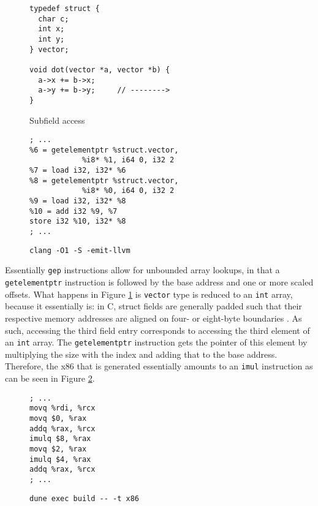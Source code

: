\documentclass{article}
\begin{document}
\begin{figure}[H]
   \begin{minipage}{0.48\textwidth}
     \centering
     \begin{verbatim}
typedef struct {
  char c;
  int x;
  int y;
} vector;

void dot(vector *a, vector *b) {
  a->x += b->x;
  a->y += b->y;     // -------->
}
     \end{verbatim}
     \caption{Subfield access}\label{fig:vector.c}
   \end{minipage}
   \begin{minipage}{0.48\textwidth}
     \centering
     \begin{verbatim}
; ...
%6 = getelementptr %struct.vector,
            %i8* %1, i64 0, i32 2
%7 = load i32, i32* %6
%8 = getelementptr %struct.vector,
            %i8* %0, i64 0, i32 2
%9 = load i32, i32* %8
%10 = add i32 %9, %7
store i32 %10, i32* %8
; ...
     \end{verbatim}
     \caption{\texttt{clang -O1 -S -emit-llvm}}\label{fig:vector.ll}
   \end{minipage}
\end{figure}
\noindent Essentially \texttt{gep} instructions allow for unbounded array lookups, in that a \texttt{getelementptr} instruction is followed by the base address and one or more scaled offsets. What happens in Figure \ref{fig:vector.ll} is \texttt{vector} type is reduced to an \texttt{int} array, because it essentially is: in C, struct fields are generally  padded such that their respective memory addresses are aligned on four- or eight-byte boundaries \cite{cstd}.
As such, accessing the third field entry corresponds to accessing the third element of an \texttt{int} array. The \texttt{getelementptr} instruction gets the pointer of this element by multiplying the size with the index and adding that to the base address.
Therefore, the x86 that is generated essentially amounts to an \texttt{imul} instruction as can be seen in Figure \ref{fig:gep}.

\begin{figure}[H]
    \centering
   \begin{minipage}{0.48\textwidth}
     \centering
     \begin{verbatim}
; ...
movq %rdi, %rcx
movq $0, %rax
addq %rax, %rcx
imulq $8, %rax
movq $2, %rax
imulq $4, %rax
addq %rax, %rcx
; ...
     \end{verbatim}
     \caption{\texttt{dune exec build -{}- -t x86}}\label{fig:gep}
   \end{minipage}
\end{figure}
\end{document}
